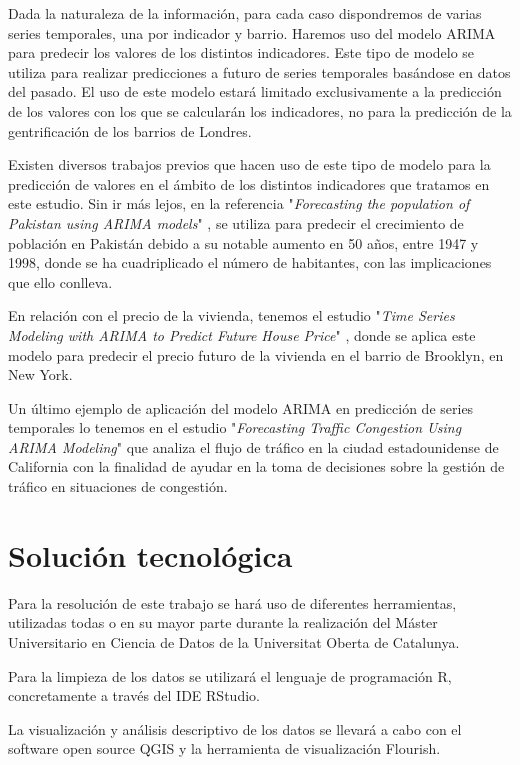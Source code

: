 \documentclass[12pt,a4paper,twoside]{book}
\begin{document}
Dada la naturaleza de la información, para cada caso dispondremos de varias series temporales, una por indicador y barrio. Haremos uso del modelo ARIMA para predecir los valores de los distintos indicadores. Este tipo de modelo se utiliza para realizar predicciones a futuro de series temporales basándose en datos del pasado. El uso de este modelo estará limitado exclusivamente a la predicción de los valores con los que se calcularán los indicadores, no para la predicción de la gentrificación de los barrios de Londres.

Existen diversos trabajos previos que hacen uso de este tipo de modelo para la predicción de valores en el ámbito de los distintos indicadores que tratamos en este estudio. Sin ir más lejos, en la referencia "\textit{Forecasting the population of Pakistan using ARIMA models}" \cite{zakria_pdf_2009}, se utiliza para predecir el crecimiento de población en Pakistán debido a su notable aumento en 50 años, entre 1947 y 1998, donde se ha cuadriplicado el número de habitantes, con las implicaciones que ello conlleva. 

En relación con el precio de la vivienda, tenemos el estudio "\textit{Time Series Modeling with ARIMA to Predict Future House Price}" \cite{ma_time_2020}, donde se aplica este modelo para predecir el precio futuro de la vivienda en el barrio de Brooklyn, en New York.

Un último ejemplo de aplicación del modelo ARIMA en predicción de series temporales lo tenemos en el estudio "\textit{Forecasting Traffic Congestion Using ARIMA Modeling}" \cite{alghamdi_forecasting_2019} que analiza el flujo de tráfico en la ciudad estadounidense de California con la finalidad de ayudar en la toma de decisiones sobre la gestión de tráfico en situaciones de congestión.

\section{Solución tecnológica}

Para la resolución de este trabajo se hará uso de diferentes herramientas, utilizadas todas o en su mayor parte durante la realización del Máster Universitario en Ciencia de Datos de la Universitat Oberta de Catalunya. 

Para la limpieza de los datos se utilizará el lenguaje de programación R, concretamente a través del IDE RStudio.

La visualización y análisis descriptivo de los datos se llevará a cabo con el software open source QGIS y la herramienta de visualización Flourish.
\end{document}
